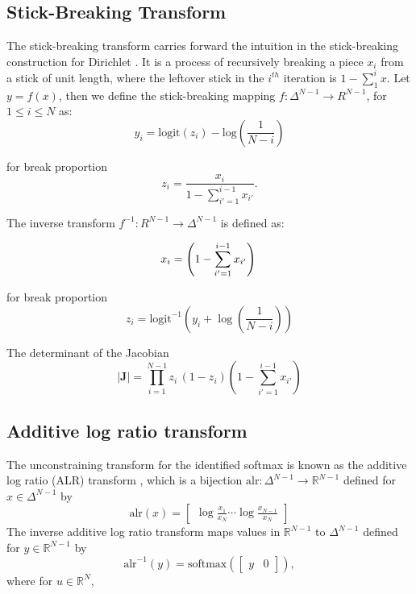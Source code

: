 \documentclass[11pt]{article}
\newcommand{\abs}[1]{\left| #1 \right|}
\begin{document}
\subsection{Stick-Breaking Transform}

The stick-breaking transform carries forward the intuition in the stick-breaking construction for Dirichlet \cite{sethuraman1994constructive}. It is a process of recursively breaking a piece $x_i$ from a stick of unit length, where the leftover stick in the $i^{th}$ iteration is $ 1 - \sum_{1}^{i}x$. Let $y = f(x)$, then we define the stick-breaking mapping $ f \colon \Delta^{N-1} \to  R^{N-1}$, for $1 \leq i \leq N$ as:	
\[
y_i
= \mathrm{logit}(z_i) - \mbox{log}\left(\frac{1}{N-i}
   \right) 
   \]
  
for break proportion 
\[ 
 z_i = \frac{x_i}{1 - \sum_{i' = 1}^{i-1} x_{i'}}.
\]

The inverse transform $ f^{-1} \colon R^{N-1} \to \Delta^{N-1}$ is defined as:

\[
x_i = \left( 1 - \sum_{i'=1}^{i-1} x_{i'} \right)\\
\]

for break proportion \[z_i = \mathrm{logit}^{-1} \left( y_i  + \log \left( \frac{1}{N - i}
                                            \right)\right)
\]
                                            
The determinant of the Jacobian
\[
   \abs{\mathbf{J}} = \prod_{i=1}^{N-1}z_i\,(1 - z_i)\left(1 - \sum_{i'=1}^{i-1} x_{i'}\right)
\]

\subsection{Additive log ratio transform}
The unconstraining transform for the identified softmax is known as
the additive log ratio (ALR) transform
\cite{aitchison1982statistical}, which is a bijection
$\textrm{alr}:\Delta^{N-1} \rightarrow \mathbb{R}^{N-1}$ defined for
$x \in \Delta^{N-1}$ by
\[
  \textrm{alr}(x)
  = \begin{bmatrix}\displaystyle
    \log \frac{x_1}{x_N} \cdots \log \frac{x_{N-1}}{x_N}
  \end{bmatrix}
\]
The inverse additive log ratio transform maps values in
$\mathbb{R}^{N-1}$ to $\Delta^{N-1}$ defined for $y \in
\mathbb{R}^{N-1}$ by
\[
  \textrm{alr}^{-1}(y)
  = \textrm{softmax}(\begin{bmatrix} y &  0 \end{bmatrix}),
\]
where for $u \in \mathbb{R}^N$,
\end{document}
